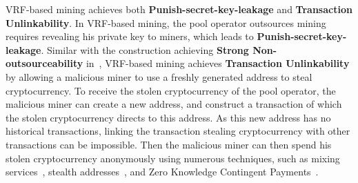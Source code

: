 VRF-based mining achieves both \textbf{Punish-secret-key-leakage} and \textbf{Transaction Unlinkability}.
In VRF-based mining, the pool operator outsources mining requires revealing his private key to miners, which leads to \textbf{Punish-secret-key-leakage}.
Similar with the construction achieving \textbf{Strong Non-outsourceability} in~\cite{miller2015nonoutsourceable}, VRF-based mining achieves \textbf{Transaction Unlinkability} by allowing a malicious miner to use a freshly generated address to steal cryptocurrency.
To receive the stolen cryptocurrency of the pool operator, the malicious miner can create a new address, and construct a transaction of which the stolen cryptocurrency directs to this address.
As this new address has no historical transactions, linking the transaction stealing cryptocurrency with other transactions can be impossible.
Then the malicious miner can then spend his stolen cryptocurrency anonymously using numerous techniques, such as mixing services~\cite{maxwell2013coinjoin, bonneau2014mixcoin, ruffing2014coinshuffle, heilman2017tumblebit}, stealth addresses~\cite{van2013cryptonote}, and Zero Knowledge Contingent Payments~\cite{maxwell2016zero}.



